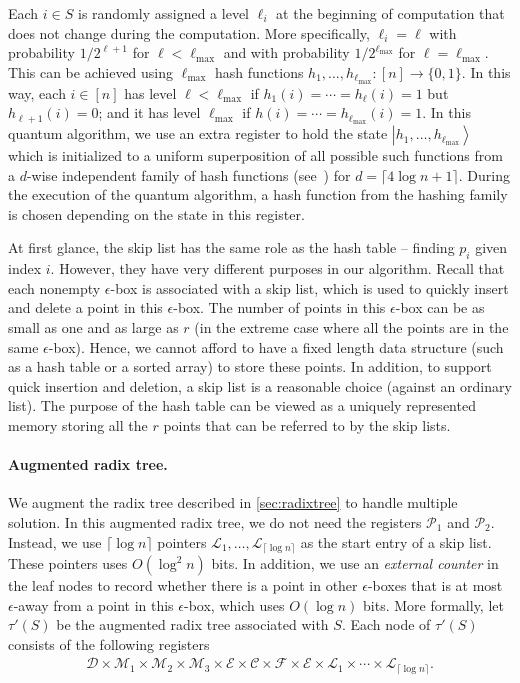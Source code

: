 \documentclass[10pt,a4paper]{article}
\newcommand{\ket}[1]{\left| #1 \right\rangle}
\newcommand{\ceil}[1]{\lceil #1 \rceil}
\begin{document}
Each $i \in S$ is randomly assigned a level $\ell_i$ at the beginning of computation that does not change during the computation. More specifically, $\ell_i = \ell$ with probability $1/2^{\ell+1}$ for $\ell < \ell_{\max}$ and with probability $1/2^{\ell_{\max}}$ for $\ell = \ell_{\max}$. This can be achieved using $\ell_{\max}$ hash functions $h_1, \ldots, h_{\ell_{\max}} : [n] \rightarrow \{0, 1\}$. In this way, each $i \in [n]$ has level $\ell<\ell_{\max}$ if $h_1(i) = \cdots = h_\ell(i) = 1$ but $h_{\ell+1}(i) = 0$; and it has level $\ell_{\max}$ if $h(i) = \cdots = h_{\ell_{\max}}(i) = 1$. In this quantum algorithm, we use an extra register to hold the state $\ket{h_1,\ldots,h_{\ell_{\max}}}$ which is initialized to a uniform superposition of all possible such functions from a $d$-wise independent family of hash functions (see~\cite[Theorem 1]{r5}) for $d = \ceil{4 \log n + 1}$. During the execution of the quantum algorithm, a hash function from the hashing family is chosen depending on the state in this register.

At first glance, the skip list has the same role as the hash table -- finding $p_i$ given index $i$. 
However, they have very different purposes in our algorithm. Recall that each nonempty $\epsilon$-box is associated with a skip list, which is used to quickly insert and delete a point in this $\epsilon$-box. The number of points in this $\epsilon$-box can be as small as one and as large as $r$ (in the extreme case where all the points are in the same $\epsilon$-box).
Hence, we cannot afford to have a fixed length data structure (such as a hash table or a sorted array) to store these points. In addition, to support quick insertion and deletion, a skip list is a reasonable choice (against an ordinary list). The purpose of the hash table can be viewed as a uniquely represented memory storing all the $r$ points that can be referred to by the skip lists.

\paragraph{Augmented radix tree.}
We augment the radix tree described in \cref{sec:radixtree} to handle multiple solution. In this augmented radix tree, we do not need the registers $\mathcal{P}_1$ and $\mathcal{P}_2$. Instead, we use $\ceil{\log n}$ pointers $\mathcal{L}_1, \ldots, \mathcal{L}_{\ceil{\log n}}$ as the start entry of a skip list. These pointers uses $O(\log^2 n)$ bits. In addition, we use an \emph{external counter} in the leaf nodes to record whether there is a point in other $\epsilon$-boxes that is at most $\epsilon$-away from a point in this $\epsilon$-box, which uses $O(\log n)$ bits. More formally, let $\tau'(S)$ be the augmented radix tree associated with $S$. 
Each node of $\tau'(S)$ consists of the following registers
\begin{align}
  \mathcal{D} \times \mathcal{M}_1 \times \mathcal{M}_2 \times \mathcal{M}_3 \times \mathcal{E} \times \mathcal{C} \times \mathcal{F} \times \mathcal{E} \times \mathcal{L}_1 \times \cdots \times \mathcal{L}_{\ceil{\log n}}.
\end{align}
\end{document}
